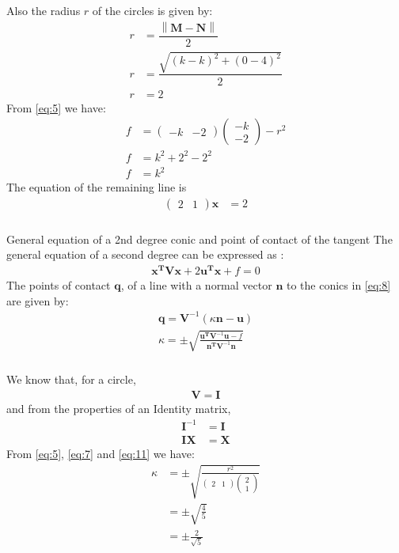 \documentclass{beamer}
\providecommand{\brak}[1]{\ensuremath{\left(#1\right)}}
\newcommand{\myvec}[1]{\ensuremath{\begin{pmatrix}#1\end{pmatrix}}}
\newcommand\norm[1]{\left\lVert#1\right\rVert}
\renewcommand{\vec}[1]{\mathbf{#1}}
\begin{document}
\begin{frame}{}
Also the radius $r$ of the circles is given by:
\begin{align}
r &= \dfrac{\norm{\vec{M}-\vec{N}}}{2} \\
r &= \dfrac{\sqrt{(k-k)^{2}+(0-4)^{2}}}{2}\\
r &= 2
\end{align}
From \eqref{eq:5} we have:
\begin{align}
f &=\myvec{-k&-2}\myvec{-k\\-2}-r^2\\
f &= k^2 + 2^2 -2^2\\
f &= k^2\label{eq:6}
\end{align}
The equation of the remaining line is
\begin{align}
\myvec{2 & 1}\vec{x}& = 2 \label{eq:7}
\end{align}  
\end{frame}

\begin{frame}
\frametitle{}
\begin{block}{General equation of a 2nd degree conic and point of contact of the tangent}
The general equation of a second degree can be expressed as :
\begin{align}
\vec{x^T}\vec{V}\vec{x}+2\vec{u^T}\vec{x}+f=0\label{eq:8}
\end{align}
The points of contact $\vec{q}$, of a line with a normal vector $\vec{n}$ to the conics in \eqref{eq:8} are given by:
\begin{align}
\vec{q} = \vec{V}^{-1}\brak{\kappa \vec{n}-\vec{u}} \label{eq:9} \\
\kappa = \pm \sqrt{\frac{\vec{u^T}\vec{V}^{-1}\vec{u}-f}{\vec{n^T}\vec{V}^{-1}\vec{n}}}\label{eq:10}
\end{align}
\end{block}
\end{frame}

\begin{frame}
\frametitle{}
We know that, for a circle, 
\begin{align}
\vec{V} = \vec{I}\label{eq:11}  
\end{align}
and from the properties of an Identity matrix, 
\begin{align}
\vec{I}^{-1} &= \vec{I} \\
\vec{I}\vec{X} &= \vec{X}   
\end{align}
From \eqref{eq:5}, \eqref{eq:7} and \eqref{eq:11} we have:
\begin{align}
\kappa &= \pm \sqrt{\frac{r^2}{\myvec{2 & 1 }\myvec{2 \\ 1 }}} \\
&= \pm \sqrt{\frac{4}{5}} \\
& =  \pm \frac{2}{\sqrt{5}}
\end{align}
\end{frame}
\end{document}
